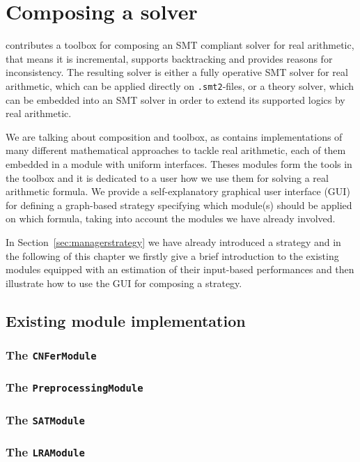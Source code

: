 \chapter{Composing a solver}
\label{chapter:composingats}
\smtrat contributes a toolbox for composing an SMT compliant solver for real arithmetic, that means it 
is incremental, supports backtracking and provides reasons for inconsistency. The resulting
solver is either a fully operative SMT solver for real arithmetic, which can be applied
directly on \texttt{.smt2}-files, or a theory solver, which can be embedded into an SMT 
solver in order to extend its supported logics by real arithmetic.

We are talking about composition and toolbox, as \smtrat contains implementations
of many different mathematical approaches to tackle real arithmetic, each of them
embedded in a module with uniform interfaces. Theses modules form the tools in the toolbox
and it is dedicated to a user how we use them for solving a real arithmetic formula.
We provide a self-explanatory graphical user interface (GUI) for defining a graph-based 
strategy specifying which module(s) should be applied on which formula, 
taking into account the modules we have already involved.

In Section~\ref{sec:managerstrategy} we have already introduced
a strategy and in the following of this chapter we firstly give a brief introduction 
to the existing modules equipped with an estimation of their input-based performances and then illustrate
how to use the GUI for composing a strategy.

\section{Existing module implementation}
\subsection{The \texttt{CNFerModule}}
\subsection{The \texttt{PreprocessingModule}}
\subsection{The \texttt{SATModule}}
\subsection{The \texttt{LRAModule}}
